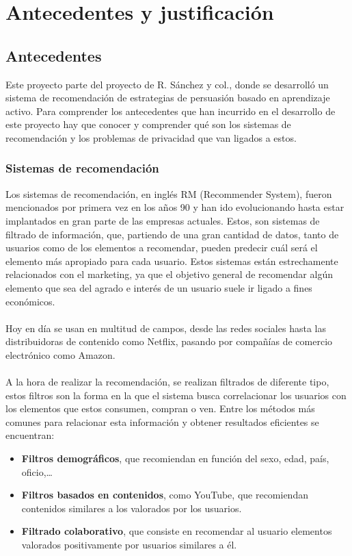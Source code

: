 \chapter{Antecedentes y justificación}
\thispagestyle{fancy}

\section{Antecedentes}
Este proyecto parte del proyecto de R. Sánchez y col.\autocite{sanchez-corcueraPersuasionbasedRecommenderSystem2020}, donde se desarrolló un sistema de recomendación de estrategias de persuasión basado en aprendizaje activo. Para comprender los antecedentes que han incurrido en el desarrollo de este proyecto hay que conocer y comprender qué son los sistemas de recomendación y los problemas de privacidad que van ligados a estos. 
\subsection{Sistemas de recomendación}
Los sistemas de recomendación, en inglés RM (Recommender System), fueron mencionados por primera vez en los años 90 y han ido evolucionando hasta estar implantados en gran parte de las empresas actuales. Estos, son sistemas de filtrado de información, que, partiendo de una gran cantidad de datos, tanto de usuarios como de los elementos a recomendar, pueden predecir cuál será el elemento más apropiado para cada usuario. Estos sistemas están estrechamente relacionados con el marketing, ya que el objetivo general de recomendar algún elemento que sea del agrado e interés de un usuario suele ir ligado a fines económicos.
\\ \\
Hoy en día se usan en multitud de campos, desde las redes sociales hasta las distribuidoras de contenido como Netflix, pasando por compañías de comercio electrónico como Amazon. 
\\ \\
A la hora de realizar la recomendación, se realizan filtrados de diferente tipo, estos filtros son la forma en la que el sistema busca correlacionar los usuarios con los elementos que estos consumen, compran o ven. Entre los métodos más comunes para relacionar esta información y obtener resultados eficientes se encuentran:
\begin{itemize}
    \item \textbf{Filtros demográficos}, que recomiendan en función del sexo, edad, país, oficio,… 
    \item \textbf{Filtros basados en contenidos}, como YouTube, que recomiendan contenidos similares a los valorados por los usuarios. 
    \item \textbf{Filtrado colaborativo}, que consiste en recomendar al usuario elementos valorados positivamente por usuarios similares a él. 
\end{itemize}

